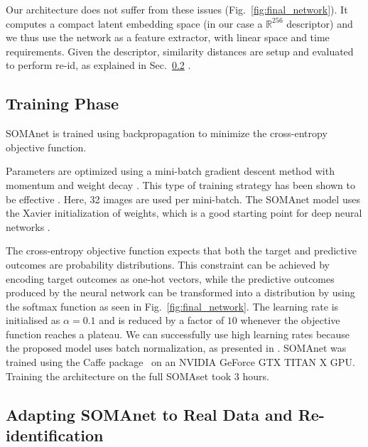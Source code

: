 \documentclass[10pt,journal,letterpaper,compsoc]{IEEEtran}
\begin{document}
Our architecture does not suffer from these issues (Fig.~\ref{fig:final_network}). It
 computes a compact latent embedding space (in our case a $\mathbb{R}^{256}$ descriptor)  and we thus use the network as a feature extractor, with linear space and time requirements.
Given the descriptor, similarity distances are setup and evaluated to perform re-id, as explained in Sec.~\ref{sec:transfer} .

\subsection{Training Phase}\label{Sec:training}

SOMAnet is trained using backpropagation \cite{Rumelhart_BP} to minimize the cross-entropy objective function.

Parameters are optimized using a mini-batch gradient descent method with momentum and weight decay \cite{sutskever2013momentum}. This type of training strategy has been shown to be effective \cite{Alexnet, googlenet, Simonyan14c}. Here, 32 images are used per mini-batch. The SOMAnet model uses the Xavier initialization of weights, which is a good starting point for deep neural networks \cite{XAVIER}.


The cross-entropy objective function expects that both the target and predictive outcomes are probability distributions. This constraint can be achieved by encoding target outcomes as one-hot vectors, while the predictive outcomes produced by the neural network can be transformed into a distribution by using the softmax function as seen in Fig.~\ref{fig:final_network}. The learning rate is initialised as $\alpha=0.1$ and is reduced by a factor of $10$ whenever the objective function reaches a plateau. We can successfully use high learning rates because the proposed model uses batch normalization, as presented in \cite{batch_norm}. SOMAnet was trained using the Caffe package~\cite{caffe} on an NVIDIA GeForce GTX TITAN X GPU.
Training the architecture on the full SOMAset took 3 hours.

\subsection{Adapting SOMAnet to Real Data and Re-identification}
\label{sec:transfer}
\end{document}
